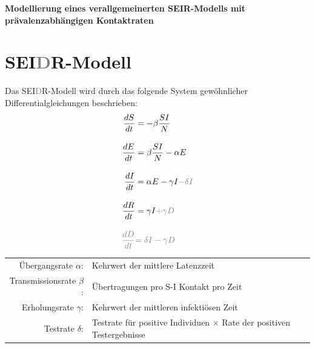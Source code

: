 \documentclass{scrartcl}
\begin{document}
\begin{center}
\huge\textbf{Modellierung eines verallgemeinerten SEIR-Modells mit prävalenzabhängigen Kontaktraten}
\end{center}

\section{SEI\textcolor{gray}{D}R-Modell}

Das SEI\textcolor{gray}{D}R-Modell wird durch das folgende System gewöhnlicher Differentialgleichungen beschrieben:
\begin{align*}
\frac{dS}{dt} &= -\beta \frac{SI}{N} \\[10pt]
\frac{dE}{dt} &= \beta \frac{SI}{N} - \alpha E \\[10pt]
\frac{dI}{dt} &= \alpha E - \gamma I \textcolor{gray}{- \delta I} \\[10pt] 
\frac{dR}{dt} &= \gamma I \textcolor{gray}{+ \gamma D} \\[10pt] 
\textcolor{gray}{\frac{dD}{dt}} &\textcolor{gray}{= \delta I - \gamma D}
\end{align*}

\begin{tabular}{rl}
	Übergangsrate $\alpha$:& Kehrwert der mittlere Latenzzeit \\
	Transmissionsrate $\beta$:& Übertragungen pro S-I Kontakt pro Zeit \\
	Erholungsrate $\gamma$:& Kehrwert der mittleren infektiösen Zeit\\
	Testrate $\delta$: &  Testrate für positive Individuen $\times$ Rate der positiven Testergebnisse
\end{tabular}

%
%
\end{document}
